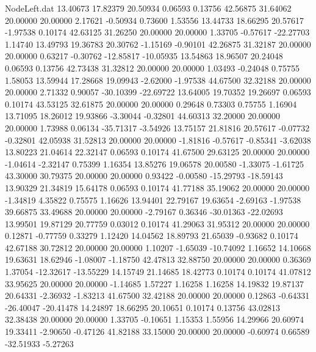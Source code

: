 \begin{filecontents}{NodeLeft.dat}
  13.40673   17.82379   20.50934     0.06593    0.13756   42.56875   31.64062   20.00000   20.00000    2.17621   -0.50934    0.73600    1.53556
  13.44733   18.66295   20.57617    -1.97538    0.10174   42.63125   31.26250   20.00000   20.00000    1.33705   -0.57617  -22.27703    1.14740
  13.49793   19.36783   20.30762    -1.15169   -0.90101   42.26875   31.32187   20.00000   20.00000    0.63217   -0.30762  -12.85817  -10.05935
  13.54863   18.96507   20.24048     0.06593    0.13756   42.73438   31.32812   20.00000   20.00000    1.03493   -0.24048    0.75755    1.58053
  13.59944   17.28668   19.09943    -2.62000   -1.97538   44.67500   32.32188   20.00000   20.00000    2.71332    0.90057  -30.10399  -22.69722
  13.64005   19.70352   19.26697     0.06593    0.10174   43.53125   32.61875   20.00000   20.00000    0.29648    0.73303    0.75755    1.16904
  13.71095   18.26012   19.93866    -3.30044   -0.32801   44.60313   32.20000   20.00000   20.00000    1.73988    0.06134  -35.71317   -3.54926
  13.75157   21.81816   20.57617    -0.07732   -0.32801   42.05938   31.52813   20.00000   20.00000   -1.81816   -0.57617   -0.85341   -3.62038
  13.80223   21.04614   22.32147     0.06593    0.10174   41.67500   29.63125   20.00000   20.00000   -1.04614   -2.32147    0.75399    1.16354
  13.85276   19.06578   20.00580    -1.33075   -1.61725   43.30000   30.79375   20.00000   20.00000    0.93422   -0.00580  -15.29793  -18.59143
  13.90329   21.34819   15.64178     0.06593    0.10174   41.77188   35.19062   20.00000   20.00000   -1.34819    4.35822    0.75575    1.16626
  13.94401   22.79167   19.63654    -2.69163   -1.97538   39.66875   33.49688   20.00000   20.00000   -2.79167    0.36346  -30.01363  -22.02693
  13.99501   19.87129   20.77759     0.03012    0.10174   41.29063   31.95312   20.00000   20.00000    0.12871   -0.77759    0.33279    1.12420
  14.04562   18.89793   21.65039    -0.93682    0.10174   42.67188   30.72812   20.00000   20.00000    1.10207   -1.65039  -10.74092    1.16652
  14.10668   19.63631   18.62946    -1.08007   -1.18750   42.47813   32.88750   20.00000   20.00000    0.36369    1.37054  -12.32617  -13.55229
  14.15749   21.14685   18.42773     0.10174    0.10174   41.07812   33.95625   20.00000   20.00000   -1.14685    1.57227    1.16258    1.16258
  14.19832   19.87137   20.64331    -2.36932   -1.83213   41.67500   32.42188   20.00000   20.00000    0.12863   -0.64331  -26.40047  -20.41478
  14.24897   18.66295   20.10651     0.10174    0.13756   43.02813   32.38438   20.00000   20.00000    1.33705   -0.10651    1.15353    1.55956
  14.29966   20.60974   19.33411    -2.90650   -0.47126   41.82188   33.15000   20.00000   20.00000   -0.60974    0.66589  -32.51933   -5.27263

\end{filecontents}
